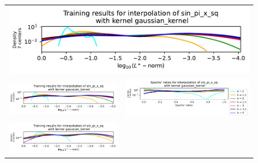 \documentclass[12pt]{report} %
\begin{document}
\begin{figure}[H]
  \hspace*{-2.8cm}
  \begin{tabular}{rl}
    \multicolumn{2}{c}{{\includegraphics[width=.7\textwidth, trim={0 3.15cm 0 0},clip=true]
    {imagenes/experiments/1d/statistical_1d_full/sin_pi_x_sq/linf_sin_pi_x_sq_C7_gaussian_kernel.pdf}}}                                                                                       \\
    {\includegraphics[width=.68\textwidth, trim={.58cm 1.25cm 0 1.155cm},clip=true]
    {imagenes/experiments/1d/statistical_1d_full/sin_pi_x_sq/linf_sin_pi_x_sq_C7_gaussian_kernel.pdf}}  & {\includegraphics[width=.62\textwidth, trim={1cm 2.4cm 2.88cm 1.17cm},clip=true]
    {imagenes/experiments/1d/statistical_1d_full/sin_pi_x_sq/epochs_sin_pi_x_sq_C7_gaussian_kernel.pdf}}                                                                                      \\
    {\includegraphics[width=.68\textwidth, trim={.58cm 1.25cm 0 1.17cm},clip=true]
    {imagenes/experiments/1d/statistical_1d_full/sin_pi_x_sq/linf_sin_pi_x_sq_C9_gaussian_kernel.pdf}}  & {\includegraphics[width=.62\textwidth, trim={1cm 2.4cm 2.88cm 1.17cm},clip=true]
}
\end{tabular}
\end{figure}
\end{document}
